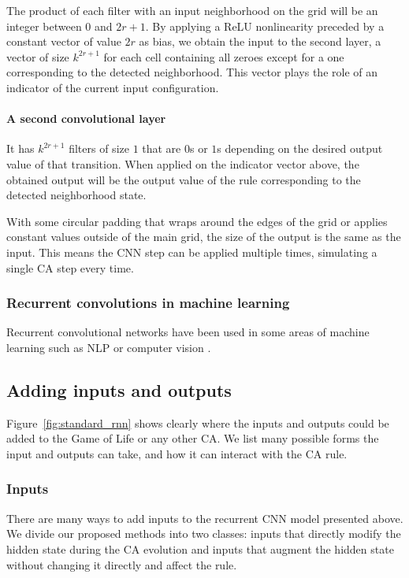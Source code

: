 The product of each filter with an input neighborhood on the grid will be an
integer between $0$ and $2r + 1$. By applying a ReLU nonlinearity preceded by a
constant vector of value $2r$ as bias, we obtain the input to the second layer,
a vector of size $k^{2r + 1}$ for each cell containing all zeroes except for a
one corresponding to the detected neighborhood. This vector plays the role of an
indicator of the current input configuration.

\paragraph{A second convolutional layer} It has $k^{2r + 1}$ filters of size $1$
that are $0$s or $1$s depending on the desired output value of that transition.
When applied on the indicator vector above, the obtained output will be the
output value of the rule corresponding to the detected neighborhood state.

With some circular padding that wraps around the edges of the grid or applies
constant values outside of the main grid, the size of the output is the same as
the input. This means the CNN step can be applied multiple times, simulating a
single \ac{CA} step every time.

\subsubsection{Recurrent convolutions in machine learning}

Recurrent convolutional networks have been used in some areas of machine
learning such as NLP or computer vision
\parencite{pinheiroRecurrentConvolutionalNeural2014,
  laiRecurrentConvolutionalNeural2015}.

\subsection{Adding inputs and outputs\label{sec:adding-inputs-outp}}

Figure~\ref{fig:standard_rnn} shows clearly where the inputs and outputs could
be added to the Game of Life or any other \ac{CA}. We list many possible forms
the input and outputs can take, and how it can interact with the \ac{CA} rule.

\subsubsection{Inputs}
There are many ways to add inputs to the recurrent \ac{CNN} model presented
above. We divide our proposed methods into two classes: inputs that directly
modify the hidden state during the CA evolution and inputs that augment the
hidden state without changing it directly and affect the rule.


